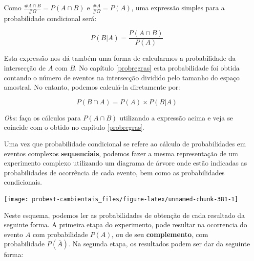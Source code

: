 \documentclass[
]{book}
\begin{document}
Como \(\frac{\#A \cap B}{\#\Omega} = P(A \cap B)\) e \(\frac{\#A}{\#\Omega} = P(A)\), uma expressão simples para a probabilidade condicional será:

\[P(B|A) = \frac{P(A \cap B)}{P(A)}\]

Esta expressão nos dá também uma forma de calcularmos a probabilidade da intersecção de \(A\) com \(B\). No capítulo \ref{probregras} esta probabilidade foi obtida contando o número de eventos na intersecção dividido pelo tamanho do espaço amostral. No entanto, podemos calculá-la diretamente por:

\[P(B \cap A) = P(A) \times P(B|A)\]

\emph{Obs}: faça os cálculos para \(P(A \cap B)\) utilizando a expressão acima e veja se coincide com o obtido no capítulo \ref{probregras}.

Uma vez que probabilidade condicional se refere ao cálculo de probabilidades em eventos complexos \textbf{sequenciais}, podemos fazer a mesma representação de um experimento complexo utilizando um diagrama de árvore onde estão indicadas as probabilidades de ocorrência de cada evento, bem como as probabilidades condicionais.

\begin{center}\texttt{[image: probest-cambientais\_files/figure-latex/unnamed-chunk-381-1]} \end{center}

Neste esquema, podemos ler as probabilidades de obtenção de cada resultado da seguinte forma. A primeira etapa do experimento, pode resultar na ocorrencia do evento \(A\) com probabilidade \(P(A)\), ou de seu \textbf{complemento}, com probabilidade \(P(\overline{A})\). Na segunda etapa, os resultados podem ser dar da seguinte forma:
\end{document}

